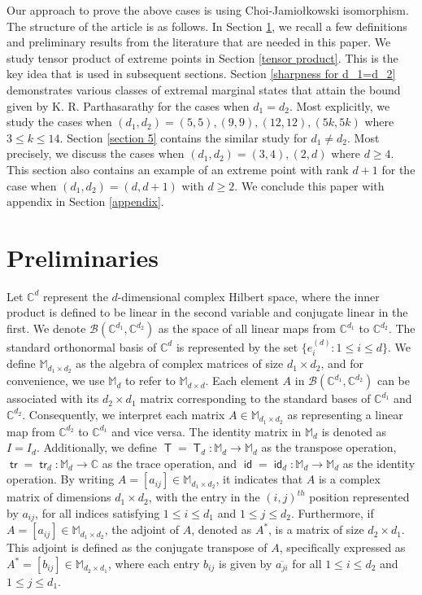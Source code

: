 \documentclass[10pt,reqno]{amsart}
\theoremstyle{definition}
\theoremstyle{plain}
\theoremstyle{remark}
\renewcommand{\sf}[1]{\textsf{#1}}
\newcommand{\mbb}[1]{\mathbb{#1}}
\newcommand{\msc}[1]{\mathscr{#1}}
\newcommand{\M}[1]{\mbb{M}_{#1}}%
\newcommand{\B}[1]{\msc{B}({#1})}
\DeclareMathOperator{\T}{\sf{T}}
\DeclareMathOperator{\tr}{\sf{tr}}
\DeclareMathOperator{\id}{\sf{id}}
\numberwithin{equation}{section}%
\begin{document}
Our approach to prove the above cases is using Choi-Jamio\l kowski isomorphism. The structure of the article is as follows. In Section \ref{pre}, we recall a few definitions and preliminary results from the literature that are needed in this paper. We study tensor product of extreme points in Section \ref{tensor product}. This is the key idea that is used in subsequent sections. Section \ref{sharpness for d_1=d_2} demonstrates various classes of extremal marginal states that attain the bound given by K. R. Parthasarathy for the cases when $d_1=d_2$. Most explicitly, we study the cases when $(d_1,d_2)=(5,5), (9,9), (12,12),(5k,5k)$ where $3\leq k\leq 14$. Section \ref{section 5} contains the similar study for $d_1\neq d_2$. Most precisely, we discuss the cases when $(d_1,d_2)=(3,4), (2,d)$ where $d\geq 4$. This section also contains an example of an extreme point with rank $d+1$ for the case when $(d_1,d_2)=(d,d+1)$ with $d\geq 2$. We conclude this paper with appendix in Section \ref{appendix}.



\section{Preliminaries}\label{pre}



Let $\mbb{C}^d$ represent the $d$-dimensional complex Hilbert space, where the inner product is defined to be linear in the second variable and conjugate linear in the first. We denote $\B{ \mbb{C}^{d_1},\mbb{C}^{d_2}}$ as the space of all linear maps from $\mbb{C}^{d_1}$ to $\mbb{C}^{d_2}$. The standard orthonormal basis of $\mbb{C}^d$ is represented by the set $\{e_i^{(d)}: 1\leq i\leq d\}$. We define $\M{d_1\times d_2}$ as the algebra of complex matrices of size $d_1\times d_2$, and for convenience, we use $\M{d}$ to refer to $\M{d\times d}$. Each element $A$ in $\B{\mbb{C}^{d_1},\mbb{C}^{d_2}}$ can be associated with its $d_2\times d_1$ matrix corresponding to the standard bases of $\mbb{C}^{d_1}$ and $\mbb{C}^{d_2}$. Consequently, we interpret each matrix $A\in\M{d_1\times d_2}$ as representing a linear map from $\mbb{C}^{d_2}$ to $\mbb{C}^{d_1}$ and vice versa. The identity matrix in $\M{d}$ is denoted as $I=I_d$. Additionally, we define $\T=\T_d: \M{d}\to \M{d}$ as the transpose operation, $\tr=\tr_{d}: \M{d}\to \mbb{C}$ as the trace operation, and $\id=\id_d:\M{d}\to\M{d}$ as the identity operation. By writing $A=[a_{ij}]\in\M{d_1\times d_2}$, it indicates that $A$ is a complex matrix of dimensions $d_1\times d_2$, with the entry in the $(i,j)^{th}$ position represented by $a_{ij}$, for all indices satisfying $1\leq i\leq d_1$ and $1\leq j\leq d_2$. Furthermore, if $A=[a_{ij}]\in\M{d_1\times d_2}$, the adjoint of $A$, denoted as $A^*$, is a matrix of size $d_2\times d_1$. This adjoint is defined as the conjugate transpose of $A$, specifically expressed as $A^*=[b_{ij}]\in\M{d_2\times d_1}$, where each entry $b_{ij}$ is given by $\overline{a_{ji}}$ for all $1\leq i\leq d_2$ and $1\leq j\leq d_1$.
\end{document}
